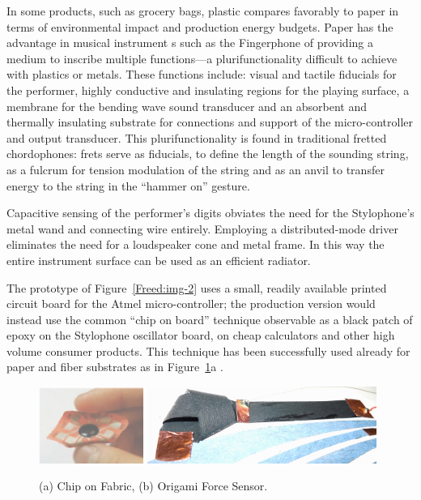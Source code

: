 In some products, such as grocery bags, plastic compares favorably
to paper in terms of environmental impact and production energy budgets.  Paper
has the advantage in musical instrument s such as the Fingerphone of providing a
medium to inscribe multiple functions---a plurifunctionality difficult to achieve
with plastics or metals. These functions include: visual and tactile fiducials
for the performer, highly conductive and insulating regions for the playing
surface, a membrane for the bending wave sound transducer and an absorbent and
thermally insulating substrate for connections and support of the
micro-controller and output transducer. This plurifunctionality is found in
traditional fretted chordophones: frets serve as fiducials, to define the length
of the sounding string, as a fulcrum for tension modulation of the string and as
an anvil to transfer energy to the string in the ``hammer on'' gesture.

Capacitive sensing of the performer's digits obviates the need for
the Stylophone's metal wand and connecting wire entirely. Employing a
distributed-mode driver eliminates the need for a loudspeaker cone and metal
frame. In this way the entire instrument surface can be used as an efficient
radiator.

The prototype of Figure~\ref{Freed:img-2} uses a small, readily available printed
circuit board for the Atmel micro-controller; the production version would
instead use the common ``chip on board'' technique observable as a black patch of
epoxy on the Stylophone oscillator board, on cheap calculators and other high
volume consumer products. This technique has been successfully used already for
paper and fiber substrates as in Figure~\ref{Freed:img-5}a \cite{Yoo:2009}.


\begin{figure}[t]
\centering
\includegraphics[height=25mm]{fig5}
\includegraphics[height=25mm]{fig6}
\caption{(a) Chip on Fabric, (b) Origami Force Sensor.}
\label{Freed:img-5}
\end{figure}

